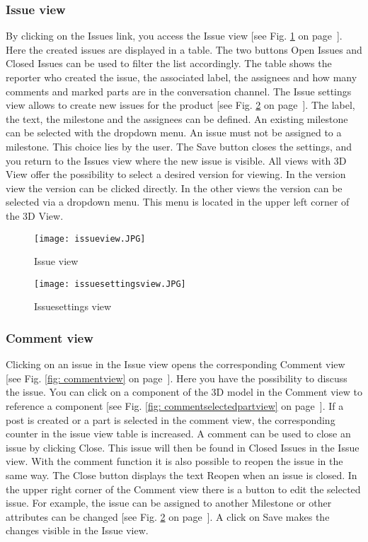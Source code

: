     \subsubsection*{Issue view}
    By clicking on the Issues link, you access the Issue view [see Fig. \ref{fig: issueview} on page~\pageref{fig: issueview}]. Here the created issues are displayed in a table. The two buttons Open Issues and Closed Issues can be used to filter the list accordingly. The table shows the reporter who created the issue, the associated label, the assignees and how many comments and marked parts are in the conversation channel. The Issue settings view allows to create new issues for the product [see Fig. \ref{fig: issuesettingsview} on page~\pageref{fig: issuesettingsview}]. The label, the text, the milestone and the assignees can be defined. An existing milestone can be selected with the dropdown menu. An issue must not be assigned to a milestone. This choice lies by the user. The Save button closes the settings, and you return to the Issues view where the new issue is visible. All views with 3D View offer the possibility to select a desired version for viewing. In the version view the version can be clicked directly. In the other views the version can be selected via a dropdown menu. This menu is located in the upper left corner of the 3D View.
    
    \begin{figure}[h]
        \centering
        \texttt{[image: issueview.JPG]}
        \caption{Issue view}
        \label{fig: issueview}
    \end{figure}


    \begin{figure}[h]
        \centering
        \texttt{[image: issuesettingsview.JPG]}
        \caption{Issuesettings view}
        \label{fig: issuesettingsview}
    \end{figure}

    \subsubsection*{Comment view}
    Clicking on an issue in the Issue view opens the corresponding Comment view [see Fig. \ref{fig: commentview} on page~\pageref{fig: commentview}]. Here you have the possibility to discuss the issue. You can click on a component of the 3D model in the Comment view to reference a component [see Fig. \ref{fig: commentselectedpartview} on page~\pageref{fig: commentselectedpartview}]. If a post is created or a part is selected in the comment view, the corresponding counter in the issue view table is increased. A comment can be used to close an issue by clicking Close. This issue will then be found in Closed Issues in the Issue view. With the comment function it is also possible to reopen the issue in the same way. The Close button displays the text Reopen when an issue is closed. In the upper right corner of the Comment view there is a button to edit the selected issue. For example, the issue can be assigned to another Milestone or other attributes can be changed [see Fig. \ref{fig: issuesettingsview} on page~\pageref{fig: issuesettingsview}]. A click on Save makes the changes visible in the Issue view.

